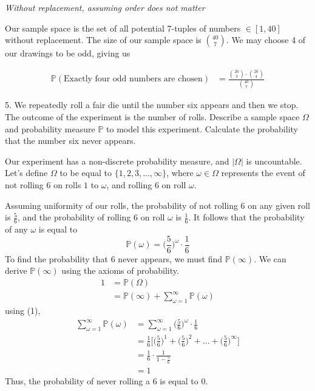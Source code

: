 \documentclass{article}
\begin{document}
\vspace{5mm}

\emph{Without replacement, assuming order does not matter}

\vspace{5mm}

Our sample space is the set of all potential 7-tuples of numbers $\in [1,40]$ without replacement.
The size of our sample space is $\binom{40}{7}$. We may choose 4 of our drawings to be odd, giving us

\begin{align*}
    \mathbb{P}(\text{Exactly four odd numbers are chosen})&=\frac{\binom{20}{3}\cdot\binom{20}{4}}{\binom{40}{7}}
\end{align*}
\vspace{5mm}

5. We repeatedly roll a fair die until the number six appears and then we stop. The outcome
of the experiment is the number of rolls. Describe a sample space $\Omega$ and probability
measure $\mathbb{P}$ to model this experiment. Calculate the probability that the number six
never appears.

\vspace{5mm}

Our experiment has a non-discrete probability measure, and $|\Omega|$ is uncountable. Let's define $\Omega$
to be equal to $\{1, 2, 3, \ldots , \infty\}$, where $\omega \in \Omega$ represents the event of not rolling
6 on rolls $1$ to $\omega$, and rolling 6 on roll $\omega$.

\vspace{5mm}

Assuming uniformity of our rolls, the probability of not rolling 6 on any given roll is $\frac{5}{6}$,
and the probability of rolling 6 on roll $\omega$ is $\frac{1}{6}$. It
follows that the probability of any $\omega$ is equal to 
\begin{equation}
    \mathbb{P}(\omega) = \bigg(\frac{5}{6}\bigg)^{\omega} \cdot \frac{1}{6}
\end{equation}
To find the probability that 6 never appears, we must find $\mathbb{P}(\infty)$. We can derive 
$\mathbb{P}(\infty)$ using the axioms of probability.
\begin{align*}
    1 &= \mathbb{P}(\Omega)\\
      &= \mathbb{P}(\infty) + \sum_{\omega=1}^{\infty} \mathbb{P}(\omega)
\end{align*}
using (1),
\begin{align*}
    \sum_{\omega=1}^{\infty} \mathbb{P}(\omega) &= \sum_{\omega=1}^{\infty} \bigg(\frac{5}{6}\bigg)^{\omega} \cdot\frac{1}{6}\\
                                                &= \frac{1}{6}\bigg[\bigg(\frac{5}{6}\bigg)^{1} + \bigg(\frac{5}{6}\bigg)^{2} + \ldots + \bigg(\frac{5}{6}\bigg)^{\infty}\bigg]\\
                                                &= \frac{1}{6}\cdot\frac{1}{1-\frac{5}{6}}\\
                                                &= 1
\end{align*} 
Thus, the probability of never rolling a 6 is equal to 0.
\end{document}

